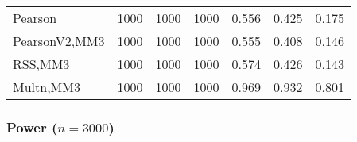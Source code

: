 \documentclass[
]{article}
\begin{document}
\begin{table}[H]
{\begin{tabular}[t]{lrrrrrr}
\hspace{1em}Pearson & 1000 & 1000 & 1000 & 0.556 & 0.425 & 0.175\\
\hspace{1em}PearsonV2,MM3 & 1000 & 1000 & 1000 & 0.555 & 0.408 & 0.146\\
\hspace{1em}RSS,MM3 & 1000 & 1000 & 1000 & 0.574 & 0.426 & 0.143\\
\hspace{1em}Multn,MM3 & 1000 & 1000 & 1000 & 0.969 & 0.932 & 0.801\\
\bottomrule
\end{tabular}}
\end{table}

\hypertarget{power-n3000-2}{%
\subsubsection{\texorpdfstring{Power
(\(n=3000\))}{Power (n=3000)}}\label{power-n3000-2}}
\end{document}
